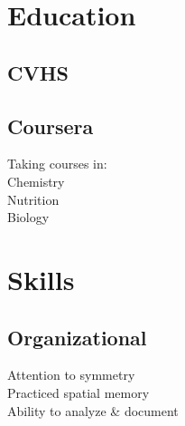 \documentclass[]{resume-openfont}
\begin{document}
%
%
\lastupdated

%
%

%
%

\begin{minipage}[t]{0.33\textwidth} 


\section{Education} 

\subsection{CVHS}
\sectionsep

\subsection{Coursera}
Taking courses in:      \\
\textbullet{} Chemistry \\
\textbullet{} Nutrition \\
\textbullet{} Biology
\sectionsep


\section{Skills}
\subsection{Organizational}
\textbullet{} Attention to symmetry            \\
\textbullet{} Practiced spatial memory         \\
\textbullet{} Ability to analyze \& document  \\
\sectionsep


\end{minipage}
\end{document}
